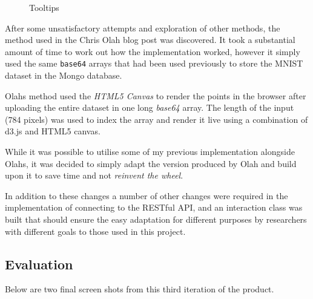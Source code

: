\documentclass[a4paper,11pt,titlepage]{article}
\begin{document}
	\begin{figure}[H]
    			\caption{Tooltips}%
	\end{figure}	
	
	\par 
	After some unsatisfactory attempts and exploration of other methods, the method used in the Chris Olah blog post \cite{Olah2014d} was discovered. It took a substantial amount of time to work out how the implementation worked, however it simply used the same \texttt{base64} arrays that had been used previously to store the MNIST dataset in the Mongo database. 
	\par 
	Olahs method used the \textit{HTML5 Canvas} to render the points in the browser after uploading the entire dataset in one long \textit{base64} array. The length of the input (784 pixels) was used to index the array and render it live using a combination of d3.js and HTML5 canvas.
	\par 
	While it was possible to utilise some of my previous implementation alongside Olahs, it was decided to simply adapt the version produced by Olah and build upon it to save time and not \textit{reinvent the wheel}.	
	\par 
	In addition to these changes a number of other changes were required in the implementation of connecting to the RESTful API, and an interaction class was built that should ensure the easy adaptation for different purposes by researchers with different goals to those used in this project.
	
	\subsection{Evaluation}
	Below are two final screen shots from this third iteration of the product. 
	
\end{document}
